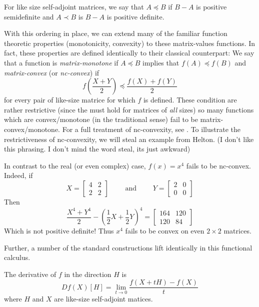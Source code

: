 \begin{definition}
\label{def:LoewnerOrder}
  For like size self-adjoint matrices, we say that \(A \preceq B\) if \(B - A \)
  is positive semidefinite and \(A \prec B\) is \(B-A\) is positive definite.
\end{definition}

With this ordering in place, we can extend many of the familiar function
theoretic properties (monotonicity, convexity) to these matrix-values functions.
In fact, these properties are defined identically to their classical counterpart:
We say that a function is \emph{matrix-monotone} if \(A \preceq B\) implies that
\(f(A) \preceq f(B)\) and \emph{matrix-convex} (or \emph{nc-convex}) if
\[
  f \left( \frac{X+Y}{2} \right) \preceq \frac{f(X)+f(Y)}{2}
\]
for every pair of like-size matrice for which \(f\) is defined. These condition
are rather restrictive (since the must hold for matrices of \emph{all} sizes) so
many functions which are convex/monotone (in the traditional sense) fail to be
matrix-convex/monotone. For a full treatment of nc-convexity, see
\cite{heltonFree2013}. To illustrate the restrictiveness of nc-convexity,
{\color{red} we will steal an example from Helton. (I don't like this phrasing. I don't
  mind the word steal, its just awkward)}
\begin{example}%
\label{ex:helton1}
  In contrast to the real (or even complex) case, \(f(x)=x^4\) fails to be nc-convex.
  Indeed, if
  \[
    X = \begin{bmatrix} 4 &2\\2&2 \end{bmatrix}  \qquad \text{ and } \qquad Y =\begin{bmatrix} 2&0\\0&0 \end{bmatrix}
  \]
  Then
  \[
    \frac{X^4+Y^4}{2} - \left( \frac{1}{2}X +\frac{1}{2}Y \right) ^4
    = \begin{bmatrix} 164 &120\\120&84 \end{bmatrix}
  \]
  Which is not positive definite! Thus \(x^4\) fails to be convex on even
  \(2\times 2\) matrices.
\end{example}

Further, a number of the standard constructions lift identically in this
functional calculus.
\begin{definition}
  \label{def:DirDeriv}
  The derivative of \(f\) in the direction \(H\) is
  \[
    Df(X)[H] = \lim_{t \to 0} \frac{f(X+tH) - f(X)}{t}
  \]
  where \(H\) and \(X\) are like-size self-adjoint matices.
\end{definition}


